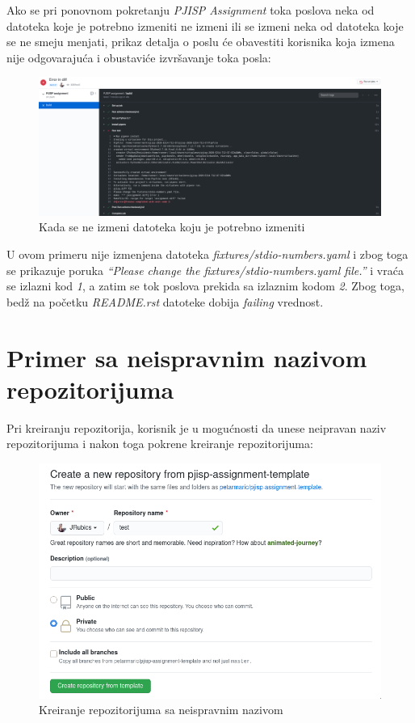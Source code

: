 \documentclass[12pt]{report}
\begin{document}
Ako se pri ponovnom pokretanju \textit{PJISP Assignment} toka poslova neka od datoteka koje je potrebno izmeniti ne izmeni ili se izmeni neka od datoteka koje se ne smeju menjati, prikaz detalja o poslu će obavestiti korisnika koja izmena nije odgovarajuća i obustaviće izvršavanje toka posla:

\begin{figure}[H]
    \centering
    \includegraphics[width=\linewidth]{images/16.png}
    \caption{Kada se ne izmeni datoteka koju je potrebno izmeniti}
\end{figure}

U ovom primeru nije izmenjena datoteka \textit{fixtures/stdio-numbers.yaml} i zbog toga se prikazuje poruka \textit{``Please change the fixtures/stdio-numbers.yaml file.''} i vraća se izlazni kod \textit{1}, a zatim se tok poslova prekida sa izlaznim kodom \textit{2}. Zbog toga, bedž na početku \textit{README.rst} datoteke dobija \textit{failing} vrednost.

\section{Primer sa neispravnim nazivom repozitorijuma}

Pri kreiranju repozitorija, korisnik je u mogućnosti da unese neipravan naziv repozitorijuma i nakon toga pokrene kreiranje repozitorijuma:

\begin{figure}[H]
    \centering
    \includegraphics[width=0.7\linewidth]{images/17.png}
    \caption{Kreiranje repozitorijuma sa neispravnim nazivom}
\end{figure}
\end{document}

